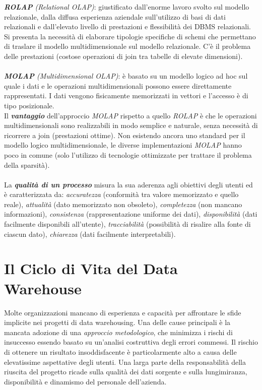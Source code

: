 \documentclass[a4paper, notitlepage, 9pt]{extreport}
\begin{document}
\noindent
\textit{\textbf{ROLAP} (Relational OLAP)}: giustificato dall’enorme lavoro svolto sul modello relazionale, dalla diffusa esperienza aziendale sull’utilizzo di basi di dati relazionali e dall’elevato livello di prestazioni e flessibilità dei DBMS relazionali.\\
Si presenta la necessità di elaborare tipologie specifiche di schemi che permettano di traslare il modello multidimensionale sul modello relazionale. C'è il problema delle prestazioni (costose operazioni di join tra tabelle di elevate dimensioni).
\\\\
\textit{\textbf{MOLAP} (Multidimensional OLAP)}: è basato su un modello logico ad hoc sul quale i dati e le operazioni multidimensionali possono essere direttamente rappresentati. I dati vengono fisicamente memorizzati in vettori e l’accesso è di tipo posizionale.\\
Il \textit{\textbf{vantaggio}} dell’approccio \textit{MOLAP} rispetto a quello \textit{ROLAP} è che le operazioni multidimensionali sono realizzabili in modo semplice e naturale, senza necessità di ricorrere a join (prestazioni ottime). Non esistendo ancora uno standard per il modello logico multidimensionale, le diverse implementazioni \textit{MOLAP} hanno poco in comune (solo l'utilizzo di tecnologie ottimizzate per trattare il problema della sparsità).
\\\\
La \textit{\textbf{qualità di un processo}} misura la sua aderenza agli obiettivi degli utenti ed è caratterizzata da: \textit{accuratezza} (conformità tra valore memorizzato e quello reale), \textit{attualità} (dato memorizzato non obsoleto), \textit{completezza} (non mancano informazioni), \textit{consistenza} (rappresentazione uniforme dei dati), \textit{disponibilità} (dati facilmente disponibili all'utente), \textit{tracciabilità} (possibilità di risalire alla fonte di ciascun dato), \textit{chiarezza} (dati facilmente interpretabili).


\section*{Il Ciclo di Vita del Data Warehouse}
Molte organizzazioni mancano di esperienza e capacità per affrontare le sfide implicite nei progetti di data warehousing. Una delle cause principali è la mancata adozione di una \textit{approccio metodologico}, che minimizza i rischi di insuccesso essendo basato su un’analisi costruttiva degli errori commessi. Il rischio di ottenere un risultato insoddisfacente è particolarmente alto a causa delle elevatissime aspettative degli utenti. Una larga parte della responsabilità della riuscita del progetto ricade sulla qualità dei dati sorgente e sulla lungimiranza, disponibilità e dinamismo del personale dell’azienda.
\end{document}
